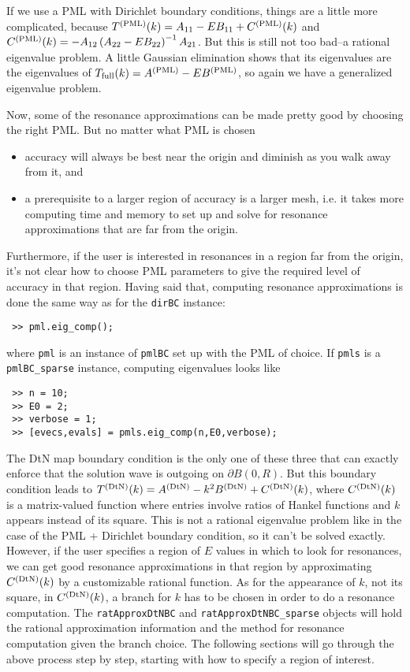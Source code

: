 If we use a PML with Dirichlet boundary conditions, things are
a little more complicated, because 
$T^{(\text{PML})}(k) = A_{11} - E B_{11} + C^{(\text{PML})}(k)$
and $C^{(\text{PML})}(k) = -A_{12} \left(A_{22} - E B_{22}\right)^{-1} A_{21}$.
But this is still not too bad--a rational eigenvalue problem. 
A little Gaussian elimination shows that
its eigenvalues are the eigenvalues of 
$T_{\text{full}}(k) = A^{(\text{PML})} - E B^{(\text{PML})}$, so again we have a
generalized eigenvalue problem.

Now, some of the resonance
approximations can be made pretty good by choosing the right PML. 
But no matter what PML is chosen
\begin{itemize} 
 \item accuracy will always be best near the origin and diminish
       as you walk away from it, and
 \item a prerequisite to a larger region of accuracy  
       is a larger mesh, i.e. 
       it takes more computing time and memory to set up and solve
       for resonance approximations that are far from the origin.
\end{itemize}
Furthermore, if the user is interested in resonances in a region
far from the origin, it's not clear how to choose PML parameters
to give the required level of accuracy in that region.
Having said that, computing resonance approximations is 
done the same way as for the {\tt dirBC} instance:
\begin{verbatim}
 >> pml.eig_comp();
\end{verbatim}
where {\tt pml} is an instance of {\tt pmlBC}
set up with the PML of choice. If {\tt pmls} is a {\tt pmlBC\_sparse}
instance, computing eigenvalues looks like
\begin{verbatim}
 >> n = 10; 
 >> E0 = 2;
 >> verbose = 1;
 >> [evecs,evals] = pmls.eig_comp(n,E0,verbose);
\end{verbatim}

The DtN map boundary condition is the only one of these three that 
can exactly enforce that the solution wave is outgoing on
$\partial B(0,R)$. But this boundary condition leads to 
$T^{(\text{DtN})}(k) = A^{(\text{DtN})} - k^2 B^{(\text{DtN})} + C^{(\text{DtN})}(k)$, where
$C^{(\text{DtN})}(k)$ is a matrix-valued function where entries involve
ratios of Hankel functions and $k$ appears instead of its square. 
This is not a rational eigenvalue problem
like in the case of the PML + Dirichlet boundary condition, so 
it can't be solved exactly. However, if the user specifies a region
of $E$ values in which to look for resonances, we can get
good resonance approximations in that region by approximating
$C^{(\text{DtN})}(k)$ by a customizable rational function. As for the
appearance of $k$, not its square,
in $C^{(\text{DtN})}(k)$, a branch for $k$ has to be chosen in order to
do a resonance computation.
The {\tt ratApproxDtNBC}
and {\tt ratApproxDtNBC\_sparse} objects will hold the rational
approximation information and the method for resonance computation
given the branch choice.
The following sections will go through the above process step by step,
starting with how to specify a region of interest.

